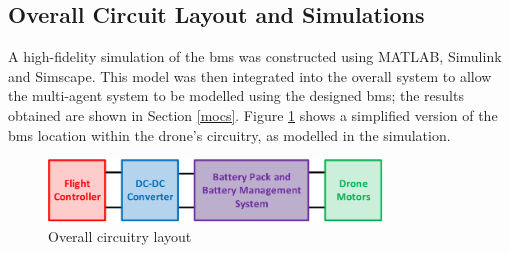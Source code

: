 \subsection{Overall Circuit Layout and Simulations}

A high-fidelity simulation of the \gls{bms} was constructed using MATLAB, Simulink and Simscape. This model was then integrated into the overall system to allow the multi-agent system to be modelled using the designed \gls{bms}; the results obtained are shown in Section \ref{mocs}. Figure \ref{fig:bms_ovrlayout} shows a simplified version of the \gls{bms} location within the drone's circuitry, as modelled in the simulation.

\begin{figure}[H]
  \centering
  \includegraphics[width=0.79\textwidth]{figs/Samuel/Figures/BMS-cropped.pdf}
  \caption{Overall circuitry layout}
  \label{fig:bms_ovrlayout}
\end{figure}

